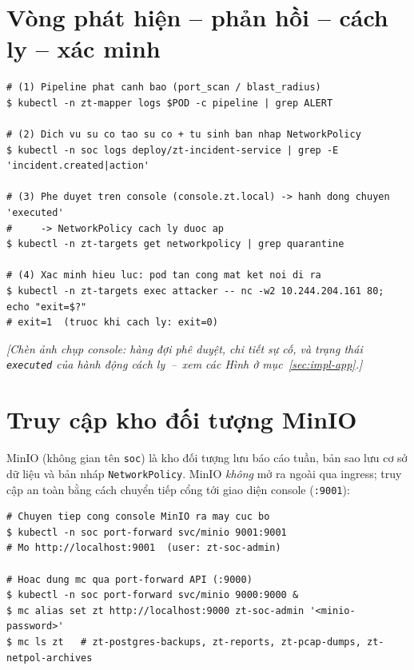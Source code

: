 \section{Vòng phát hiện -- phản hồi -- cách ly -- xác minh}

\begin{lstlisting}[language={},caption={Quan sát vòng end-to-end từ phát hiện tới cách ly.}]
# (1) Pipeline phat canh bao (port_scan / blast_radius)
$ kubectl -n zt-mapper logs $POD -c pipeline | grep ALERT

# (2) Dich vu su co tao su co + tu sinh ban nhap NetworkPolicy
$ kubectl -n soc logs deploy/zt-incident-service | grep -E 'incident.created|action'

# (3) Phe duyet tren console (console.zt.local) -> hanh dong chuyen 'executed'
#     -> NetworkPolicy cach ly duoc ap
$ kubectl -n zt-targets get networkpolicy | grep quarantine

# (4) Xac minh hieu luc: pod tan cong mat ket noi di ra
$ kubectl -n zt-targets exec attacker -- nc -w2 10.244.204.161 80; echo "exit=$?"
# exit=1  (truoc khi cach ly: exit=0)
\end{lstlisting}

\noindent\textit{[Chèn ảnh chụp console: hàng đợi phê duyệt, chi tiết sự cố, và trạng
thái \texttt{executed} của hành động cách ly~--~xem các Hình ở
mục~\ref{sec:impl-app}.]}

\section{Truy cập kho đối tượng MinIO}
\label{app:demo-minio}

MinIO (không gian tên \texttt{soc}) là kho đối tượng lưu báo cáo tuần, bản sao lưu cơ sở
dữ liệu và bản nháp \texttt{NetworkPolicy}. MinIO \emph{không} mở ra ngoài qua ingress;
truy cập an toàn bằng cách chuyển tiếp cổng tới giao diện console (\texttt{:9001}):

\begin{lstlisting}[language={},caption={Truy cập MinIO console và liệt kê bucket.}]
# Chuyen tiep cong console MinIO ra may cuc bo
$ kubectl -n soc port-forward svc/minio 9001:9001
# Mo http://localhost:9001  (user: zt-soc-admin)

# Hoac dung mc qua port-forward API (:9000)
$ kubectl -n soc port-forward svc/minio 9000:9000 &
$ mc alias set zt http://localhost:9000 zt-soc-admin '<minio-password>'
$ mc ls zt   # zt-postgres-backups, zt-reports, zt-pcap-dumps, zt-netpol-archives
\end{lstlisting}

